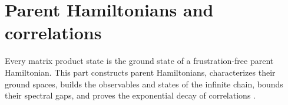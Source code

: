 \part{Parent Hamiltonians and correlations}
\label{part:hamiltonians}

Every matrix product state is the ground state of a frustration-free parent
Hamiltonian. This part constructs parent Hamiltonians, characterizes their
ground spaces, builds the observables and states of the infinite chain, bounds
their spectral gaps, and proves the exponential decay of
correlations \cite[Sections~II.C and~IV.C]{Cirac2021Matrix}.

